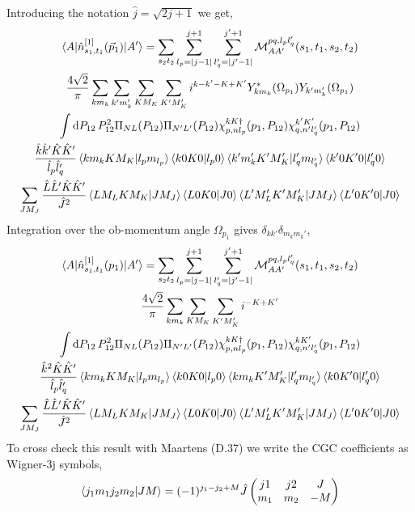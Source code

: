 \documentclass[10pt]{article}
\def\threej#1{\inthreej(#1)}
\def\inthreej(#1,#2,#3,#4,#5,#6){\begin{pmatrix}#1 & #2 & #3 \\ #4 & #5 & #6 \end{pmatrix}}
\begin{document}
Introducing the notation $\hat{j} = \sqrt{2 j + 1}$ we get,
\begin{multline*}
\braket{ A | \hat{n}_{s_1,t_1}^{[1]}(\vec{p}_1) | A'} = \sum_{s_2 t_2}  \sum_{l_p = |j-1|}^{j+1} \sum_{l_q' = |j' - 1|}^{j'+1} \mathcal{M}_{AA'}^{p q,l_p l_q'}(s_1,t_1,s_2,t_2) \\
 \frac{ 4 \sqrt{2}}{\pi} \sum_{k m_k} \sum_{k' m_k'} \sum_{K M_K} \sum_{K' M_K'} i^{k-k'-K+K'} Y_{k m_k}^{*}(\Omega_{p_1}) Y_{k' m_k'}(\Omega_{p_1}) \\
 \int \text{d} P_{12} \, P_{12}^{2} \Pi_{N L}(P_{12}) \Pi_{N' L'}(P_{12}) \chi_{p,nl_p}^{kK\dagger}(p_1,P_{12}) \chi_{q,n'l_q'}^{k'K'}(p_1,P_{12}) \\
     \frac{ \hat{k} \hat{k}' \hat{K} \hat{K}' }{ \hat{l}_p \hat{l}_{q}'} \braket{ k m_k K M_K | l_p m_{l_p}} \braket{ k 0 K 0 | l_p 0} \braket{ k' m_k' K' M_K' | l_q' m_{l_q'}} \braket{ k' 0 K' 0 | l_q' 0} \\
    \sum_{J M_J} \frac{ \hat{L} \hat{L}' \hat{K} \hat{K}' }{\hat{J}^{2}} \braket{ L M_L K M_K | J M_J} \braket{ L 0 K 0 | J 0 } \braket{L' M_L' K' M_K' | J M_J } \braket{ L' 0 K' 0 | J 0 } \\ 
\end{multline*}
Integration over the ob-momentum angle $\Omega_{p_1}$ gives $ \delta_{k k'} \delta_{m_k m_k'}$,
\begin{multline*}
\braket{ A | \hat{n}_{s_1,t_1}^{[1]}(p_1) | A'} = \sum_{s_2 t_2}  \sum_{l_p = |j-1|}^{j+1} \sum_{l_q' = |j' - 1|}^{j'+1} \mathcal{M}_{AA'}^{p q,l_p l_q'}(s_1,t_1,s_2,t_2) \\
 \frac{ 4 \sqrt{2}}{\pi} \sum_{k m_k} \sum_{K M_K} \sum_{K' M_K'} i^{-K+K'} \\
 \int \text{d} P_{12} \, P_{12}^{2} \Pi_{N L}(P_{12}) \Pi_{N' L'}(P_{12}) \chi_{p,nl_p}^{kK\dagger}(p_1,P_{12}) \chi_{q,n'l_q'}^{k K'}(p_1,P_{12}) \\
     \frac{ \hat{k}^{2} \hat{K} \hat{K}' }{ \hat{l}_p \hat{l}_{q}'} \braket{ k m_k K M_K | l_p m_{l_p}} \braket{ k 0 K 0 | l_p 0} \braket{ k m_k K' M_K' | l_q' m_{l_q'}} \braket{ k 0 K' 0 | l_q' 0} \\
    \sum_{J M_J} \frac{ \hat{L} \hat{L}' \hat{K} \hat{K}' }{\hat{J}^{2}} \braket{ L M_L K M_K | J M_J} \braket{ L 0 K 0 | J 0 } \braket{L' M_L' K' M_K' | J M_J } \braket{ L' 0 K' 0 | J 0 }
\end{multline*}
To cross check this result with Maartens (D.37) we write the CGC coefficients as Wigner-3j symbols,
\begin{align*}
	\braket{ j_1 m_1 j_2 m_2 | J M } = (-1)^{j_1 - j_2 + M} \hat{J} \threej{j1,j2,J,m_1,m_2,-M}
\end{align*}
\end{document}
